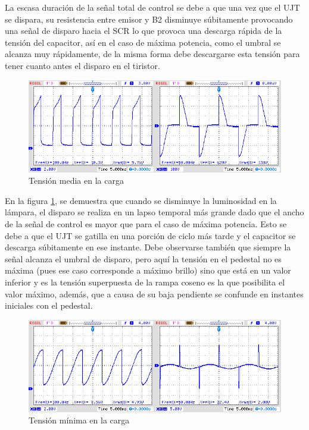 \documentclass{article}
\begin{document}
 La escasa duración de la señal total de control se debe a que una vez que el UJT se dispara, su resistencia entre emisor y B2 disminuye súbitamente provocando una señal de             disparo hacia el SCR lo que provoca una descarga rápida de la tensión del capacitor, así en el caso de máxima potencia, como el umbral se alcanza muy rápidamente, de la misma               forma debe descargarse esta tensión para tener cuanto antes el disparo en el tiristor. 
%
\begin{figure}[h]
 \begin{center}
	\includegraphics[width=\textwidth]{imagenes/fig6.jpg} 
	\caption{Tensión media en la carga}\label{fig:fig6}
 \end{center}
\end{figure}
%
En la figura \textcolor{blue}{\ref{fig:fig6}}, se demuestra que cuando se disminuye la luminosidad en la lámpara, el disparo se realiza en un lapso temporal más grande dado que el ancho de la señal de control es mayor que para el caso de máxima potencia. Esto se debe a que el UJT se gatilla en una porción de ciclo más tarde y el capacitor se descarga súbitamente en ese instante. Debe observarse también que siempre la señal alcanza el umbral de disparo, pero aquí la tensión en el pedestal no es máxima (pues ese caso corresponde a máximo brillo) sino que está en un valor inferior y es la tensión superpuesta de la rampa coseno es la que posibilita el valor máximo, además, que a causa de su baja pendiente se confunde en instantes iniciales con el pedestal. 
%
\begin{figure}[h]
 \begin{center}
	\includegraphics[width=\textwidth]{imagenes/fig7.jpg} 
	\caption{Tensión mínima en la carga}\label{fig:fig7}
 \end{center}
\end{figure}
%
\end{document}

